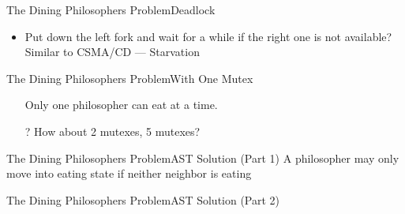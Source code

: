 \begin{frame}{The Dining Philosophers Problem}{Deadlock}
  \begin{center}
  \end{center}
  \begin{itemize}
  \item Put down the left fork and wait for a while if the right one is not available?
    Similar to CSMA/CD --- Starvation
  \end{itemize}
\end{frame}

\begin{frame}{The Dining Philosophers Problem}{With One Mutex}
  \begin{minipage}{.5\linewidth}
    \centering
  \end{minipage} \hfill
  \begin{minipage}{.45\linewidth}
    \centering%
    \mode<beamer>{ \texttt{[image: dphil-0]} }%
     \pause
    \begin{itemize}
    \item[\Bad] Only one philosopher can eat at a time.
    \item[?] How about 2 mutexes, 5 mutexes?
    \end{itemize}
  \end{minipage}
\end{frame}

\begin{frame}{The Dining Philosophers Problem}{AST Solution (Part 1)}
  A philosopher may only move into eating state if neither neighbor is eating
  \begin{center}
  \end{center}
\end{frame}

\begin{frame}{The Dining Philosophers Problem}{AST Solution (Part 2)}
  \begin{center}
  \end{center}\pause
\end{frame}

